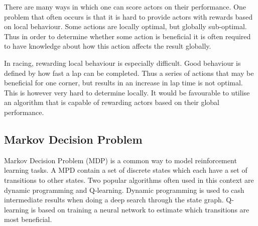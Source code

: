 There are many ways in which one can score actors on their performance. One problem that often occurs is that it is hard to provide actors with rewards based on local behaviour. Some actions are locally optimal, but globally sub-optimal. Thus in order to determine whether some action is beneficial it is often required to have knowledge about how this action affects the result globally.

In racing, rewarding local behaviour is especially difficult. Good behaviour is defined by how fast a lap can be completed. Thus a series of actions that may be beneficial for one corner, but results in an increase in lap time is not optimal. This is however very hard to determine locally. It would be favourable to utilise an algorithm that is capable of rewarding actors based on their global performance.





\subsection{Markov Decision Problem}
Markov Decision Problem (MDP) is a common way to model reinforcement learning tasks. A MPD contain a set of discrete states which each have a set of transitions to other states. Two popular algorithms often used in this context are dynamic programming and Q-learning. Dynamic programming is used to cash intermediate results when doing a deep search through the state graph. Q-learning is based on training a neural network to estimate which transitions are most beneficial. 

